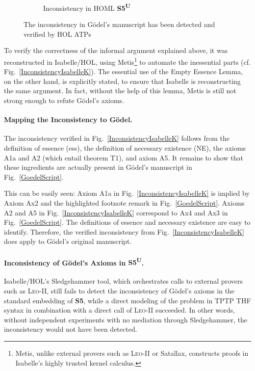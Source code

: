 \documentclass{llncs}
\newcommand{\logic}[1]{\textbf{#1}\xspace}
\newcommand{\SFive}{\logic{S5}}
\newcommand{\SFiveU}{\logic{S5\textsuperscript{U}}}
\begin{document}
\begin{figure}[t]
\begin{subfigure}[t]{0.28\textwidth}
     \caption{Inconsistency in HOML \SFiveU} \label{Inconsistency_S5U} 
   \end{subfigure}
 \caption{The inconsistency in G\"{o}del's manuscript has been
   detected and verified by HOL ATPs} 
\end{figure}
To verify the correctness of the informal argument explained above, it
was reconstructed in Isabelle/HOL, using Metis\footnote{Metis, unlike
  external provers such as \textsc{Leo-II} or Satallax, 
  constructs proofs in Isabelle's highly trusted kernel calculus.} to automate the
inessential parts (cf. Fig.~\ref {InconsistencyIsabelleK}). The essential use of the Empty Essence Lemma, on
the other hand, is explicitly stated, to ensure that Isabelle is
reconstructing the same argument. In fact, without the help of this
lemma, Metis is still not strong enough to refute G\"odel's
axioms.


\paragraph{Mapping the Inconsistency to G\"odel.}
The inconsistency verified in Fig.~\ref{InconsistencyIsabelleK} follows from the definition of
essence (ess), the definition of necessary existence (NE), the
axioms A1a and A2 (which entail theorem T1), and axiom A5. It remains to show that
these ingredients are actually present in G\"odel's manuscript in
Fig.~\ref{GoedelScript}. 


This can be easily seen: Axiom A1a in
Fig.~\ref{InconsistencyIsabelleK} is implied by Axiom Ax2 and the
highlighted footnote remark in Fig.~\ref{GoedelScript}. Axioms A2 and
A5 in Fig.~\ref{InconsistencyIsabelleK} correspond to Ax4 and Ax3 in
Fig.~\ref{GoedelScript}. The definitions of essence and necessary
existence are easy to identify. Therefore, the verified
inconsistency from Fig.~\ref{InconsistencyIsabelleK} does apply to 
G\"odel's original manuscript.


\paragraph{Inconsistency of G\"odel's Axioms in \SFiveU.}
Isabelle/HOL's Sledgehammer tool, which orchestrates calls to
external provers such as \textsc{Leo-II}, still
fails to detect the inconsistency of G\"odel's axioms in the standard
embedding of \SFive, while a direct modeling of the problem in TPTP THF syntax
in combination with a direct call of \textsc{Leo-II} succeeded. In
other words, without independent experiments with no mediation through Sledgehammer, the
inconsistency would not have been detected.
\end{document}
